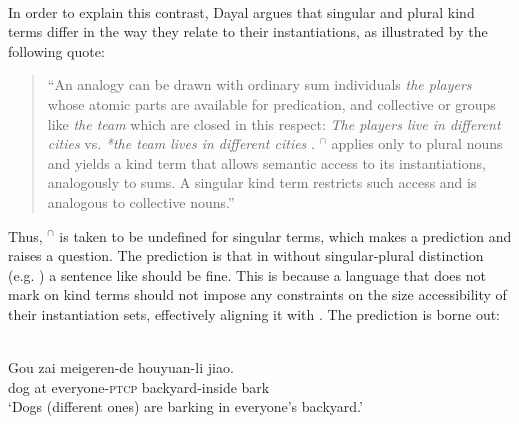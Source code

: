 \documentclass[output=paper,
modfonts
]{langscibook}
\begin{document}
	\ea \label{ex:despic:38}
	 \\
	\z 
	\z 
	
	In order to explain this contrast, Dayal argues that singular and plural kind terms differ in the way they relate to their instantiations, as illustrated by the following quote:
	
	\begin{quotation} 
		``An analogy can be drawn with ordinary sum individuals \textit{the players} whose atomic parts are available for predication, and collective  or groups like \textit{the team} which are closed in this respect: \textit{The players live in different cities} vs. \textit{*the team lives in different cities} \citep{Barker1992, Schwarzschild1996}. $^\cap$ applies only to plural nouns and yields a kind term that allows semantic access to its instantiations, analogously to sums. A singular kind term restricts such access and is analogous to collective nouns.'' \citep[1100]{Dayal2011}
	\end{quotation} 
	
	Thus, $^\cap$ is taken to be undefined for singular terms, which makes a prediction and raises a question. The prediction is that in  without singular-plural distinction (e.g. ) a sentence like  should be fine. This is because a language that does not mark  on kind terms should not impose any constraints on the size accessibility of their instantiation sets, effectively aligning it with . The prediction is borne out:
	
	\ea \label{ex:despic:39}
	 \\
	\gll
	{Gou} {zai} {meigeren-de} {houyuan-li} {jiao.} \\
	dog at everyone-\textsc{ptcp} backyard-inside bark \\
	\glt `Dogs (different ones) are barking in everyone's backyard.' \citep[413]{Dayal2004}
	\z 
	
\end{document}
